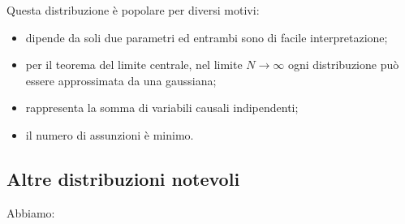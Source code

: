 \documentclass[10pt]{article}
\begin{document}
Questa distribuzione è popolare per diversi motivi:
\begin{itemize}
\item dipende da soli due parametri ed entrambi sono di facile interpretazione;
\item per il teorema del limite centrale, nel limite $N\longrightarrow\infty$ ogni distribuzione può essere approssimata da una gaussiana;
\item rappresenta la somma di variabili causali indipendenti;
\item il numero di assunzioni è minimo.
\end{itemize}

\subsection{Altre distribuzioni notevoli}
Abbiamo:
\end{document}
